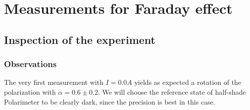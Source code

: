\section{Measurements for Faraday effect}
\subsection{Inspection of the experiment}
\subsubsection{Observations}
The very first measurement with $I=0.0A$ yields as expected a rotation of the polarization
with $\alpha = 0.6 \pm 0.2$. We will choose the reference state of half-shade Polarimeter 
to be clearly dark, since the precision is best in this case.
